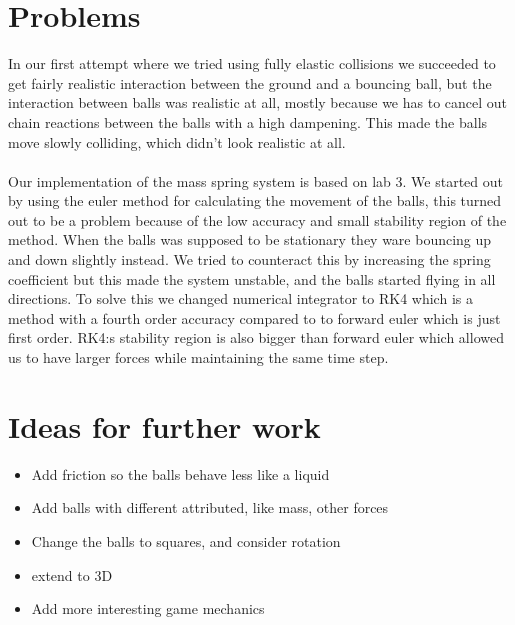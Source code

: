 \documentclass[11pt]{article} %
\begin{document}
\section{Problems}
In our first attempt where we tried using fully elastic collisions we succeeded to get fairly realistic interaction between the ground and a bouncing ball, but the interaction between balls was realistic at all, mostly because we has to cancel out chain reactions between the balls with a high dampening. This made the balls move slowly colliding, which didn't look realistic at all.
\\  \\
Our implementation of the mass spring system is based on lab 3. We started out by using the euler method for calculating the movement of the balls, this turned out to be a problem because of the low accuracy and small stability region of the method. When the balls was supposed to be stationary they ware bouncing up and down slightly instead. We tried to counteract this by increasing the spring coefficient but this made the system unstable, and the balls started flying in all directions. To solve this we changed numerical integrator to RK4 which is a method with a fourth order accuracy compared to to forward euler which is just first order. RK4:s stability region is also bigger than forward euler which allowed us to have larger forces while maintaining the same time step.

\section{Ideas for further work}
\begin{itemize}
\item{Add friction so the balls behave less like a liquid}
\item{Add balls with different attributed, like mass, other forces}
\item{Change the balls to squares, and consider rotation}
\item{extend to 3D}
\item{Add more interesting game mechanics }
\end{itemize}
\end{document}
